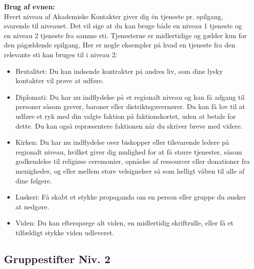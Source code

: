 \textbf{Brug af evnen:}\\
Hvert niveau af Akademiske Kontakter giver dig én tjeneste pr. spilgang, svarende til niveauet. Det vil sige at du kan bruge både en niveau 1 tjeneste og en niveau 2 tjeneste fra samme sti. Tjenesterne er midlertidige og gælder kun for den pågældende spilgang. Her er nogle eksempler på hvad en tjeneste fra den relevante sti kan bruges til i niveau 2:\\
\begin{itemize}
    \item Brutalitet: Du kan indsende kontrakter på andres liv, som dine lysky kontakter vil prøve at udføre.
    \item Diplomati: Du har nu indflydelse på et regionalt niveau og kan få adgang til personer såsom grever, baroner eller distriktsguvernører. Du kan få lov til at udføre et ryk med din valgte faktion på faktionskortet, uden at betale for dette. Du kan også repræsentere faktionen når du skriver breve med videre.
    \item Kirken: Du har nu indflydelse over biskopper eller tilsvarende ledere på regionalt niveau, hvilket giver dig mulighed for at få større tjenester, såsom godkendelse til religiøse ceremonier, opnåelse af ressourcer eller donationer fra menigheder, og eller mellem store velsignelser så som helligt våben til alle af dine følgere.
    \item Luskeri: Få skabt et stykke propaganda om en person eller gruppe du ønsker at nedgøre. 
    \item Viden: Du kan efterspørge alt viden, en midlertidig skriftrulle, eller få et tilfældigt stykke viden udleveret. 
\end{itemize}

\subsection*{Gruppestifter Niv. 2}


